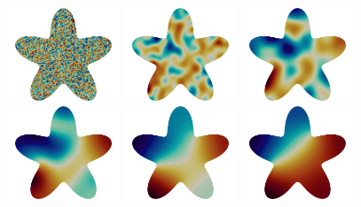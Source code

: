 \documentclass[11pt]{article}
\begin{document}
\begin{titlepage}
\begin{center}
        \begin{figure}[H]
            \centering
            \includegraphics[width=0.3\textwidth]{results/illustration/w0.png}
            \includegraphics[width=0.3\textwidth]{results/illustration/w2.png}
            \includegraphics[width=0.3\textwidth]{results/illustration/w10.png}
            \vspace{10pt}
            \includegraphics[width=0.3\textwidth]{results/illustration/w50.png}
            \includegraphics[width=0.3\textwidth]{results/illustration/w200.png}
            \includegraphics[width=0.3\textwidth]{results/illustration/w1000.png}
        \end{figure}


\end{center}
\end{titlepage}
\end{document}
